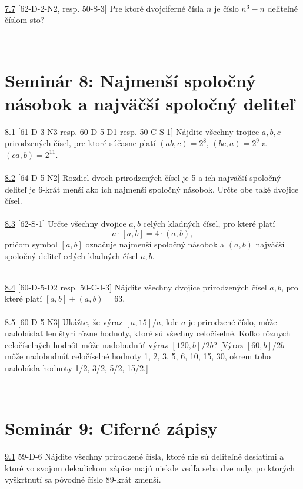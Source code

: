 \\

\noindent \ul{7.7} [62-D-2-N2, resp. 50-S-3] Pre ktoré dvojciferné čísla $n$ je číslo $n^3 - n$ deliteľné číslom sto?


\\

\section*{Seminár 8: Najmenší spoločný násobok a najväčší spoločný deliteľ}

\noindent \ul{8.1} [61-D-3-N3 resp. 60-D-5-D1 resp. 50-C-S-1] Nájdite všechny trojice $a, b, c$ prirodzených čísel, pre ktoré súčasne platí $(ab, c) = 2^8$, $(bc, a) = 2^9$ a $(ca, b) = 2^{11}$. \\
\\
\ul{8.2} [64-D-5-N2] Rozdiel dvoch prirodzených čísel je 5 a ich najväčší spoločný deliteľ je 6-krát menší ako ich najmenší spoločný násobok. Určte obe také dvojice čísel.\\
\\
\ul{8.3} [62-S-1]
Určte všechny dvojice $a, b$ celých kladných čísel, pro které platí
$$a \cdot [a, b] = 4 \cdot (a, b),$$
pričom symbol $[a, b]$ označuje najmenší spoločný násobok a $(a, b)$ najväčší spoločný deliteľ celých kladných čísel $a, b$.


\\

\noindent \ul{8.4} [60-D-5-D2 resp. 50-C-I-3] Nájdite všechny dvojice prirodzených čísel $a, b$, pro které platí $[a, b] + (a, b) = 63$.\\
\\
\ul{8.5} [60-D-5-N3] Ukážte, že výraz $[a, 15]/a$, kde $a$ je prirodzené číslo, môže nadobúdať len štyri rôzne hodnoty, ktoré sú všechny celočíselné. Koľko rôznych celočíselných hodnôt môže nadobudnúť výraz $[120, b]/2b$? [Výraz $[60, b]/2b$ môže nadobudnúť celočíselné hodnoty 1, 2, 3, 5, 6, 10, 15, 30, okrem toho nadobúda hodnoty 1/2, 3/2, 5/2, 15/2.]

\\

\section*{Seminár 9: Ciferné zápisy}

\noindent \ul{9.1}  59-D-6 Nájdite všechny prirodzené čísla, ktoré nie sú deliteľné desiatimi a ktoré vo svojom dekadickom zápise majú niekde vedľa seba dve nuly, po ktorých vyškrtnutí sa pôvodné číslo 89-krát zmenší.


